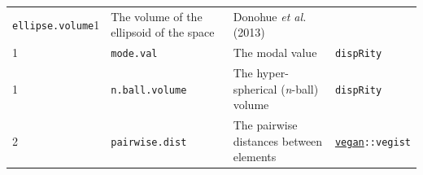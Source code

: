 \documentclass[]{book}
\theoremstyle{definition}
\theoremstyle{definition}
\theoremstyle{definition}
\theoremstyle{remark}
\begin{document}
\begin{longtable}[]{@{}llll@{}}
\begin{minipage}[t]{0.08\columnwidth}
\texttt{ellipse.volume}1\strut
\end{minipage} & \begin{minipage}[t]{0.61\columnwidth}\raggedright\strut
The volume of the ellipsoid of the space\strut
\end{minipage} & \begin{minipage}[t]{0.11\columnwidth}\raggedright\strut
Donohue \emph{et al.} (2013)\strut
\end{minipage}\tabularnewline
\begin{minipage}[t]{0.08\columnwidth}\raggedright\strut
1\strut
\end{minipage} & \begin{minipage}[t]{0.08\columnwidth}\raggedright\strut
\texttt{mode.val}\strut
\end{minipage} & \begin{minipage}[t]{0.61\columnwidth}\raggedright\strut
The modal value\strut
\end{minipage} & \begin{minipage}[t]{0.11\columnwidth}\raggedright\strut
\texttt{dispRity}\strut
\end{minipage}\tabularnewline
\begin{minipage}[t]{0.08\columnwidth}\raggedright\strut
1\strut
\end{minipage} & \begin{minipage}[t]{0.08\columnwidth}\raggedright\strut
\texttt{n.ball.volume}\strut
\end{minipage} & \begin{minipage}[t]{0.61\columnwidth}\raggedright\strut
The hyper-spherical (\emph{n}-ball) volume\strut
\end{minipage} & \begin{minipage}[t]{0.11\columnwidth}\raggedright\strut
\texttt{dispRity}\strut
\end{minipage}\tabularnewline
\begin{minipage}[t]{0.08\columnwidth}\raggedright\strut
2\strut
\end{minipage} & \begin{minipage}[t]{0.08\columnwidth}\raggedright\strut
\texttt{pairwise.dist}\strut
\end{minipage} & \begin{minipage}[t]{0.61\columnwidth}\raggedright\strut
The pairwise distances between elements\strut
\end{minipage} & \begin{minipage}[t]{0.11\columnwidth}\raggedright\strut
\href{https://cran.r-project.org/web/packages/vegan/index.html}{\texttt{vegan}}\texttt{::vegist}\strut

\end{minipage}
\end{longtable}
\end{document}

